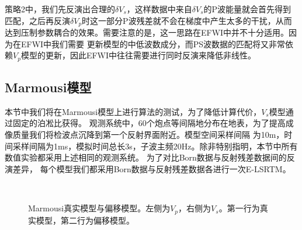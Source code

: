 策略2中，我们先反演出合理的$\delta V_s$，这样数据中来自$\delta
V_s$的P波能量就会首先得到匹配，之后再反演$\delta
V_p$时这一部分P波残差就不会在梯度中产生太多的干扰，从而达到压制参数耦合的效果。需要注意的是，这一思路在EFWI中并不十分适用。因为在EFWI中我们需要
更新模型的中低波数成分，而PS波数据的匹配将又非常依赖$V_p$模型的更新，因此EFWI中往往需要进行同时反演来降低非线性。

\subsection{Marmousi模型}
本节中我们将在Marmousi模型上进行算法的测试，为了降低计算代价，$V_s$模型通过固定的泊凇比获得。
观测系统中，60个炮点等间隔地分布在地表，为了提高成像质量我们将检波点沉降到第一个反射界面附近。模型空间采样间隔
为10m，时间采样间隔为1ms，模拟时间总长3s，子波主频20Hz。除非特别指明，本节中所有数值实验都采用上述相同的观测系统。
为了对比Born数据与反射残差数据间的反演差异，
每个模型我们都采用Born数据与反射残差数据各进行一次E-LSRTM。
\begin{figure}
   \centering
   \\
   \caption{Marmousi真实模型与偏移模型。左侧为$V_p$，右侧为$V_s$。第一行为真实模型，第二行为偏移模型。}
   \label{fig:TrueAndInitial_1}
\end{figure}
